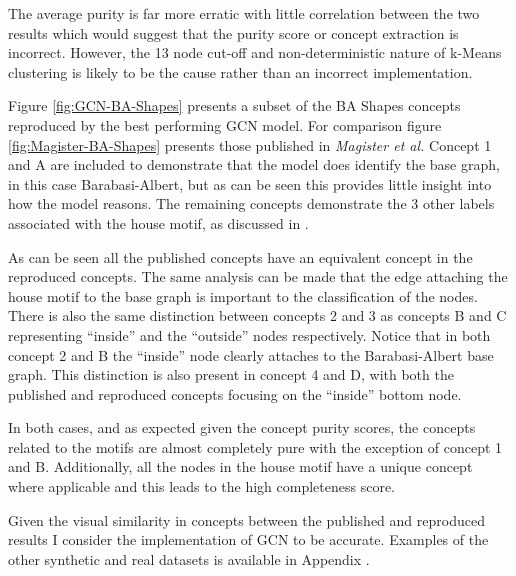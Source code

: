 The average purity is far more erratic with little correlation between the two results which would suggest that the purity score or concept extraction is incorrect.
However, the 13 node cut-off and non-deterministic nature of k-Means clustering is likely to be the cause rather than an incorrect implementation.



Figure \ref{fig:GCN-BA-Shapes} presents a subset of the BA Shapes concepts reproduced by the best performing GCN model.
For comparison figure \ref{fig:Magister-BA-Shapes} presents those published in \textit{Magister et al.}
Concept 1 and A are included to demonstrate that the model does identify the base graph, in this case Barabasi-Albert, but as can be seen this provides little insight into how the model reasons.
The remaining concepts demonstrate the 3 other labels associated with the house motif, as discussed in .

As can be seen all the published concepts have an equivalent concept in the reproduced concepts.
The same analysis can be made that the edge attaching the house motif to the base graph is important to the classification of the nodes.
There is also the same distinction between concepts 2 and 3 as concepts B and C representing ``inside'' and the ``outside'' nodes respectively.
Notice that in both concept 2 and B the  ``inside'' node clearly attaches to the Barabasi-Albert base graph.
This distinction is also present in concept 4 and D, with both the published and reproduced concepts focusing on the ``inside'' bottom node.

In both cases, and as expected given the concept purity scores, the concepts related to the motifs are almost completely pure with the exception of concept 1 and B.
Additionally, all the nodes in the house motif have a unique concept where applicable and this leads to the high completeness score.

Given the visual similarity in concepts between the published and reproduced results I consider the implementation of GCN to be accurate.
Examples of the other synthetic and real datasets is available in Appendix .

